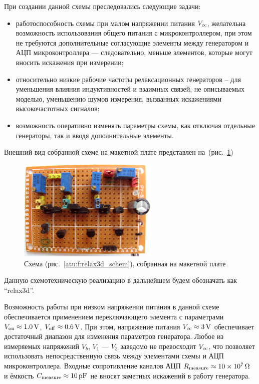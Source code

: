 При создании данной схемы преследовались следующие задачи:
\begin{itemize}

  \item
    работоспособность схемы при малом напряжении питания $V_\mathrm{cc}$,
    желательна возможность использования общего питания с микроконтроллером,
    при этом не требуются дополнительные согласующие элементы
    между генератором и АЦП микроконтроллера --- следовательно,
    меньше элементов, которые могут вносить искажения при измерении;

  \item
    относительно низкие рабочие частоты релаксационных генераторов --
    для уменьшения влияния индуктивностей и взаимных связей, не описываемых моделью,
    уменьшению шумов измерения, вызванных искажениями высокочастотных сигналов;

  \item
    возможность оперативно изменять параметры схемы, как отключая отдельные генераторы,
    так и вводя дополнительные элементы.

\end{itemize}

Внешний вид собранной схеме на макетной плате представлен на~(рис.~\ref{atu:f:relax3d_board})

\begin{figure}[htb!]
  \centerline{\includegraphics[width=0.6\textwidth]{p/relax3d_board.jpg} }
  \caption{Схема (рис.~\ref{atu:f:relax3d_schem}), собранная на макетной плате}
  \label{atu:f:relax3d_board}
\end{figure}

Данную схемотехническую реализацию в дальнейшем будем обозначать как ``relax3d''.

Возможность работы при низком напряжении питания в данной схеме обеспечивается
применением переключающего элемента с параметрами
$V_\mathrm{on} \approx \SI{1.0}{\volt}$,
$V_\mathrm{off} \approx \SI{0.6}{\volt}$.
При этом, напряжение питания $V_\mathrm{cc} \approx \SI{3}{\volt}$
обеспечивает достаточный диапазон для изменения параметров генератора.
Любое из измеряемых напряжений $V_b$, $V_1$ --- $V_3$
заведомо не превосходит $V_\mathrm{cc}$,
что позволяет использовать непосредственную связь
между элементами схемы и АЦП микроконтроллера.
Входные сопротивление каналов АЦП $R_\mathrm{measure} \approx \SI{10e7}{\ohm}$
и ёмкость $C\Tidx{measure} \approx \SI{10}{\pico\farad} $
не вносят заметных искажений в работу генератора.

